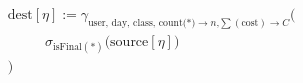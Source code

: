 \documentclass{article}
\newcommand{\source}[1]{\ensuremath{\text{source}\left[{#1}\right]}}
\newcommand{\dest}[1]{\ensuremath{\text{dest}\left[{#1}\right]}}
\newcommand{\isfinal}[1]{\ensuremath{\text{isFinal}\left({#1}\right)}}
\newcommand{\ind}{\ensuremath{\phantom{= =}}}
\begin{document}
\begin{center}
\begin{preview}
	\hspace*{-2.5cm}\vbox{
	\begin{align*}
		&\dest{\eta} := \gamma_{\text{user, day, class, count(*)} \rightarrow n \text{,} \sum (\text{cost}) \rightarrow C} \bigl( \nonumber\\
		&\ind \sigma_{\isfinal{*}}\bigl( \source{\eta} \bigr) \nonumber\\
		&\bigr) \nonumber\\
	\end{align*}
	}\hspace*{-2.5cm}
\end{preview}
\end{center}
\end{document}
